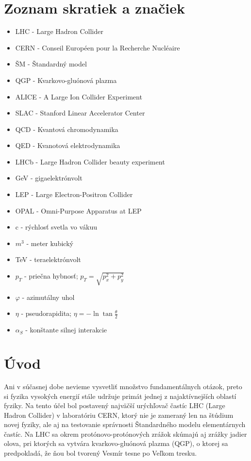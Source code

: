 \documentclass[thesismargins, thesislinespacing]{rnthesis}
\begin{document}
\chapter*{Zoznam skratiek a značiek}
\begin{itemize}
	\item[] LHC - Large Hadron Collider
	\item[] CERN - Conseil Européen pour la Recherche Nucléaire
	\item[] ŠM - Štandardný model
	\item[] QGP - Kvarkovo-gluónová plazma
	\item[] ALICE - A Large Ion Collider Experiment
	\item[] SLAC - Stanford Linear Accelerator Center
	\item[] QCD - Kvantová chromodynamika
	\item[] QED - Kvanotová elektrodynamika
	\item[] LHCb - Large Hadron Collider beauty experiment
	\item[] GeV - gigaelektrónvolt
	\item[] LEP - Large Electron-Positron Collider
	\item[] OPAL - Omni-Purpose Apparatus at LEP
	\item[] c - rýchlosť svetla vo vákuu
	\item[] $m^3$ - meter kubický
	\item[] TeV - teraelektrónvolt
	\item[] $p_T$ - priečna hybnosť; $p_T=\sqrt{p_{x}^2+p_{y}^2}$
	\item[] $\varphi$ - azimutálny uhol
	\item[] $\eta$ - pseudorapidita; $\eta=-\ln \tan {\frac{\theta}{2}}$
	\item[] $\alpha_S$ - konštante silnej interakcie
\end{itemize}
\newpage


\chapter*{Úvod}

Ani v súčasnej dobe nevieme vysvetliť množstvo fundamentálnych otázok, preto si fyzika vysokých energií stále udržuje primát jednej z najaktívnejších oblastí fyziky. Na tento účel bol postavený najväčší urýchľovač častíc LHC (Large Hadron Collider) v laboratóriu CERN, ktorý nie je zameraný len na štúdium novej fyziky, ale aj na testovanie správnosti Štandardného modelu elementárnych častíc. Na LHC sa okrem protónovo-protónových zrážok skúmajú aj zrážky jadier olova, pri ktorých  sa vytvára kvarkovo-gluónová plazma (QGP), o ktorej sa predpokladá, že ňou bol tvorený Vesmír tesne po Veľkom tresku. 
\end{document}
